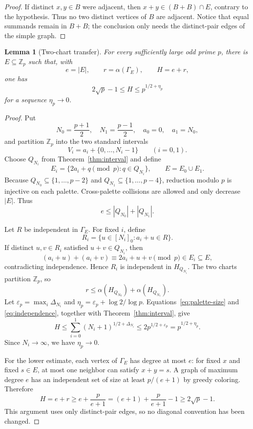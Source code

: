 \documentclass[11pt]{article}
\newtheorem{lemma}[theorem]{Lemma}
\theoremstyle{definition}
\newcommand{\Zp}{\mathbb Z_p}
\newcommand{\alphaG}{\alpha}
\begin{document}
\begin{proof}
If distinct $x,y\in B$ were adjacent, then
$x+y\in(B+B)\cap E$, contrary to the hypothesis.  Thus no two distinct
vertices of $B$ are adjacent.  Notice that equal summands remain in $B+B$;
the conclusion only needs the distinct-pair edges of the simple graph.
\end{proof}

\begin{lemma}[Two-chart transfer]\label{lem:transfer}
For every sufficiently large odd prime $p$, there is $E\subseteq\Zp$ such
that, with
\[
  e=|E|,\qquad r=\alphaG(\Gamma_E),\qquad H=e+r,
\]
one has
\[
  2\sqrt p-1\le H\le p^{1/2+\eta_p}
\]
for a sequence $\eta_p\to0$.
\end{lemma}

\begin{proof}
Put
\[
 N_0=\frac{p+1}{2},\quad N_1=\frac{p-1}{2},\quad
 a_0=0,\quad a_1=N_0,
\]
and partition $\Zp$ into the two standard intervals
\[
 V_i=a_i+\{0,\ldots,N_i-1\}\qquad(i=0,1).
\]
Choose $Q_{N_i}$ from Theorem~\ref{thm:interval} and define
\[
 E_i=\{2a_i+q\pmod p:q\in Q_{N_i}\},
 \qquad E=E_0\cup E_1.
\]
Because $Q_{N_0}\subseteq\{1,\ldots,p-2\}$ and
$Q_{N_1}\subseteq\{1,\ldots,p-4\}$, reduction modulo $p$ is injective on
each palette.  Cross-palette collisions are allowed and only decrease $|E|$.
Thus
\[
 e\le |Q_{N_0}|+|Q_{N_1}|.                 \label{eq:palette-size}
\]

Let $R$ be independent in $\Gamma_E$.  For fixed $i$, define
\[
 R_i=\{u\in[N_i]_0:a_i+u\in R\}.
\]
If distinct $u,v\in R_i$ satisfied $u+v\in Q_{N_i}$, then
\[
 (a_i+u)+(a_i+v)\equiv2a_i+u+v\pmod p\in E_i\subseteq E,
\]
contradicting independence.  Hence $R_i$ is independent in $H_{Q_{N_i}}$.
The two charts partition $\Zp$, so
\[
 r\le\alphaG(H_{Q_{N_0}})+\alphaG(H_{Q_{N_1}}).
                                                        \label{eq:independence}
\]
Let $\varepsilon_p=\max_i\Delta_{N_i}$ and
$\eta_p=\varepsilon_p+\log 2/\log p$.
Equations~\eqref{eq:palette-size} and \eqref{eq:independence}, together with
Theorem~\ref{thm:interval}, give
\[
 H\le\sum_{i=0}^1(N_i+1)^{1/2+\Delta_{N_i}}
   \le2p^{1/2+\varepsilon_p}=p^{1/2+\eta_p}.
\]
Since $N_i\to\infty$, we have $\eta_p\to0$.

For the lower estimate, each vertex of $\Gamma_E$ has degree at most $e$:
for fixed $x$ and fixed $s\in E$, at most one neighbor can satisfy $x+y=s$.
A graph of maximum degree $e$ has an independent set of size at least
$p/(e+1)$ by greedy coloring.  Therefore
\[
 H=e+r\ge e+\frac p{e+1}
   =(e+1)+\frac p{e+1}-1\ge2\sqrt p-1.
\]
This argument uses only distinct-pair edges, so no diagonal convention has
been changed.
\end{proof}
\end{document}
